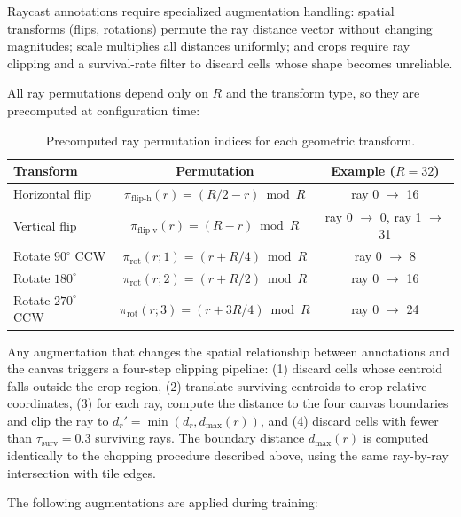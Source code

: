 \label{sec:data-augmentation}

Raycast annotations require specialized augmentation handling: spatial transforms (flips, rotations) permute the ray distance vector without changing magnitudes; scale multiplies all distances uniformly; and crops require ray clipping and a survival-rate filter to discard cells whose shape becomes unreliable.

All ray permutations depend only on $R$ and the transform type, so they are precomputed at configuration time:

\begin{table}[H]
    \centering
    \caption{Precomputed ray permutation indices for each geometric transform.}
    \begin{tabular}{lcc}
        \hline
        \textbf{Transform} & \textbf{Permutation} & \textbf{Example ($R = 32$)} \\
        \hline
        Horizontal flip & $\pi_{\text{flip-h}}(r) = (R/2 - r) \bmod R$ & ray 0 $\to$ 16 \\
        Vertical flip   & $\pi_{\text{flip-v}}(r) = (R - r) \bmod R$     & ray 0 $\to$ 0, ray 1 $\to$ 31 \\
        Rotate $90^\circ$ CCW  & $\pi_{\text{rot}}(r; 1) = (r + R/4) \bmod R$   & ray 0 $\to$ 8 \\
        Rotate $180^\circ$     & $\pi_{\text{rot}}(r; 2) = (r + R/2) \bmod R$   & ray 0 $\to$ 16 \\
        Rotate $270^\circ$ CCW & $\pi_{\text{rot}}(r; 3) = (r + 3R/4) \bmod R$ & ray 0 $\to$ 24 \\
        \hline
    \end{tabular}
\end{table}

Any augmentation that changes the spatial relationship between annotations and the canvas triggers a four-step clipping pipeline: (1) discard cells whose centroid falls outside the crop region, (2) translate surviving centroids to crop-relative coordinates, (3) for each ray, compute the distance to the four canvas boundaries and clip the ray to $d_r' = \min(d_r, d_{\max}(r))$, and (4) discard cells with fewer than $\tau_{\text{surv}} = 0.3$ surviving rays. The boundary distance $d_{\max}(r)$ is computed identically to the chopping procedure described above, using the same ray-by-ray intersection with tile edges.

The following augmentations are applied during training:

